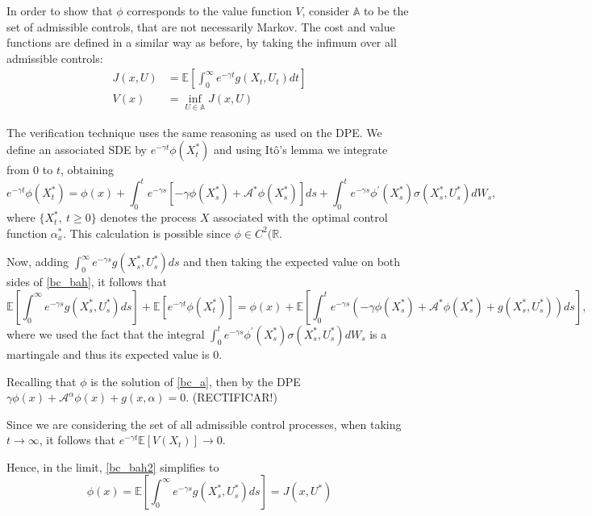 In order to show that $\phi$ corresponds to the value function $V$, consider $\mathds{A}$ to be the set of admissible controls, that are not necessarily Markov. The cost and value functions are defined in a similar way as before, by taking the infimum over all admissible controls:
\begin{align*}
	J(x,U)&=\mathds{E} \left[ \int^\infty_0 e^{-\gamma t}g(X_t,U_t)dt\right]  \\
	V(x)&=\inf_{U \in \mathds{A}} J(x,U)
\end{align*}

The verification technique uses the same reasoning as used on the DPE. We define an associated SDE by $e^{-\gamma t}\phi(X_t^*)$ and using Itô's lemma we integrate from 0 to $t$, obtaining
\begin{equation}
e^{-\gamma t}\phi(X_t^*)=\phi(x)+\int^t_0 e^{-\gamma s}[-\gamma \phi(X_s^*)+\mathcal{A^*}\phi(X^*_s)] ds+\int^t_0 e^{-\gamma s} \phi^\prime(X^*_s)\sigma(X^*_s,U^*_s) dW_s,
\label{bc_bah}
\end{equation}
where $\{X_t^*, \ t \geq 0\}$ denotes the process $X$ associated with the optimal control function $\alpha^*_x$. This calculation is possible since $\phi \in C^2(\mathds{R}$.

Now, adding $\int^\infty_0 e^{-\gamma s}g(X_s^*,U_s^*)ds$ and then taking the expected value on both sides of \eqref{bc_bah}, it follows that
\begin{equation}
\mathds{E} \left[ \int^\infty_0 e^{-\gamma s}g(X_s^*,U_s^*)ds \right] + \mathds{E} \left[ e^{-\gamma t}\phi(X_t^*) \right]=
\phi(x)+ \mathds{E} \left[ \int^t_0 e^{-\gamma s}(-\gamma \phi(X_s^*)+\mathcal{A^*}\phi(X^*_s)+g(X_s^*,U_s^*)) ds \right],
\label{bc_bah2}
\end{equation}
where we used the fact that the integral $\int^t_0 e^{-\gamma s} \phi^\prime(X^*_s)\sigma(X^*_s,U^*_s) dW_s$ is a martingale and thus its expected value is 0.


Recalling that $\phi$ is the solution of \eqref{bc_a}, then by the DPE $\gamma \phi(x)+\mathcal{A}^\alpha \phi(x)+g(x,\alpha)=0$. (RECTIFICAR!)

Since we are considering the set of all admissible control processes, when taking $t \rightarrow \infty$, it follows that $e^{-\gamma t} \mathds{E}[V(X_t)] \rightarrow 0$.

Hence, in the limit, \eqref{bc_bah2} simplifies to
\begin{equation}
	\phi(x)=\mathds{E} \left[ \int^\infty_0 e^{-\gamma s}g(X_s^*,U_s^*)ds \right]=J(x,U^*)
	\label{bc_bah3}
\end{equation}

